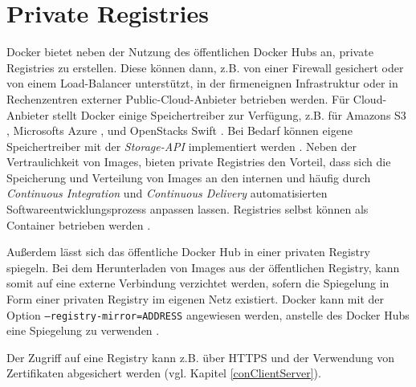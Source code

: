 \documentclass[../main.tex]{subfiles}
\begin{document}


  \section{Private Registries}
    Docker bietet neben der Nutzung des öffentlichen Docker Hubs an, private Registries zu erstellen. Diese können dann, z.B. von einer Firewall gesichert oder von einem Load-Balancer unterstützt, in der firmeneignen Infrastruktur oder in Rechenzentren externer Public-Cloud-Anbieter betrieben werden. Für Cloud-Anbieter stellt Docker einige Speichertreiber zur Verfügung, z.B. für Amazons S3 \cite{dockerStorageDriverS3}, Microsofts Azure \cite{dockerStorageDriverAzure}, und OpenStacks Swift \cite{dockerStorageDriverSwift}. Bei Bedarf können eigene Speichertreiber mit der \emph{Storage-API} implementiert werden \cite{dockerStorageDriver}.
    Neben der Vertraulichkeit von Images, bieten private Registries den Vorteil, dass sich die Speicherung und Verteilung von Images an den internen und häufig durch \emph{Continuous Integration} und \emph{Continuous Delivery} automatisierten Softwareentwicklungsprozess anpassen lassen. Registries selbst können als Container betrieben werden \cite{dockerRegistry}.

    Außerdem lässt sich das öffentliche Docker Hub in einer privaten Registry spiegeln. Bei dem Herunterladen von Images aus der öffentlichen Registry, kann somit auf eine externe Verbindung verzichtet werden, sofern die Spiegelung in Form einer privaten Registry im eigenen Netz existiert. Docker kann mit der Option \texttt{--registry-mirror=ADDRESS} angewiesen werden, anstelle des Docker Hubs eine Spiegelung zu verwenden \cite{dockerRegistryMirror}.

    Der Zugriff auf eine Registry kann z.B. über \acrshort{HTTPS} und der Verwendung von Zertifikaten abgesichert werden \cite{dockerRegistry} (vgl. Kapitel \ref{conClientServer}).
\end{document}
